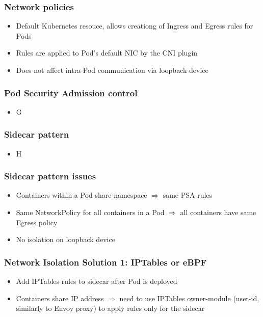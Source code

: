 \documentclass{beamer}
\begin{document}
\begin{frame}
\frametitle{Network policies}

\begin{itemize}
  \item Default Kubernetes resouce, allows creationg of Ingress and Egress rules for Pods
  \item Rules are applied to Pod's default NIC by the CNI plugin
  \item Does not affect intra-Pod communication via loopback device
\end{itemize}
\end{frame}

\begin{frame}
\frametitle{Pod Security Admission control}

\begin{itemize}
  \item G
\end{itemize}
\end{frame}

\begin{frame}
\frametitle{Sidecar pattern}

\begin{itemize}
  \item H
\end{itemize}
\end{frame}

\begin{frame}
\frametitle{Sidecar pattern issues}

\begin{itemize}
  \item Containers within a Pod share namespace $\Rightarrow$ same PSA rules
  \item Same NetworkPolicy for all containers in a Pod $\Rightarrow$ all containers have same Egress policy
  \item No isolation on loopback device
\end{itemize}
\end{frame}

\begin{frame}
\frametitle{Network Isolation Solution 1: IPTables or eBPF}

\begin{itemize}
  \item Add IPTables rules to sidecar after Pod is deployed
  \item Containers share IP address $\Rightarrow$ need to use IPTables owner-module (user-id, similarly to Envoy proxy) to apply rules only for the sidecar
\end{itemize}
\end{frame}
\end{document}
